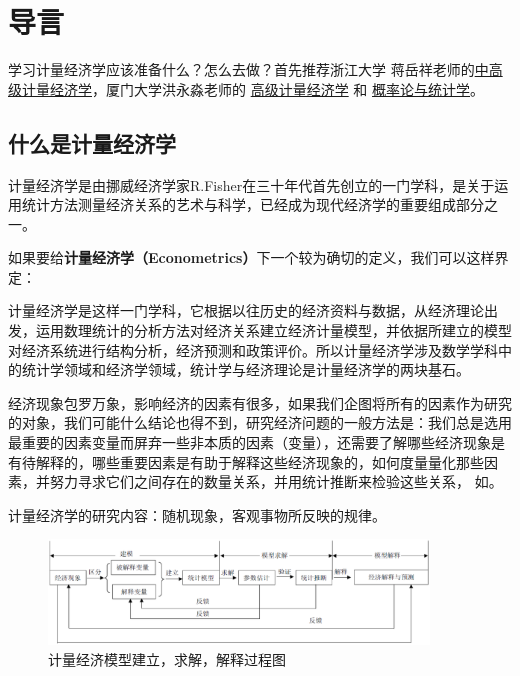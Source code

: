 \chapter{导言}

学习计量经济学应该准备什么？怎么去做？首先推荐浙江大学
蒋岳祥老师的\href{https://www.bilibili.com/video/BV1es411W7KU?from=search&seid=3253765381861883959}{中高级计量经济学}，厦门大学洪永淼老师的
\href{https://www.icourse163.org/course/XMU-1002606048}{高级计量经济学}  和
\href{https://www.bilibili.com/video/BV11t411A7bp}{概率论与统计学}。

\section{什么是计量经济学}

计量经济学是由挪威经济学家R.Fisher在三十年代首先创立的一门学科，是关于运用统计方法测量经济关系的艺术与科学，已经成为现代经济学的重要组成部分之一。

如果要给{\bf{计量经济学（Econometrics）}}下一个较为确切的定义，我们可以这样界定：

计量经济学是这样一门学科，它根据以往历史的经济资料与数据，从经济理论出发，运用数理统计的分析方法对经济关系建立经济计量模型，并依据所建立的模型对经济系统进行结构分析，经济预测和政策评价。所以计量经济学涉及数学学科中的统计学领域和经济学领域，统计学与经济理论是计量经济学的两块基石。

经济现象包罗万象，影响经济的因素有很多，如果我们企图将所有的因素作为研究的对象，我们可能什么结论也得不到，研究经济问题的一般方法是：我们总是选用最重要的因素变量而屏弃一些非本质的因素（变量），还需要了解哪些经济现象是有待解释的，哪些重要因素是有助于解释这些经济现象的，如何度量量化那些因素，并努力寻求它们之间存在的数量关系，并用统计推断来检验这些关系，
如。

计量经济学的研究内容：随机现象，客观事物所反映的规律。

\begin{figure}[!htbp]
	\centering %
	\includegraphics[width=0.9\textwidth]{Econometrics.eps}
	\caption{计量经济模型建立，求解，解释过程图}
	\label{fig:Econometrics}
\end{figure}


